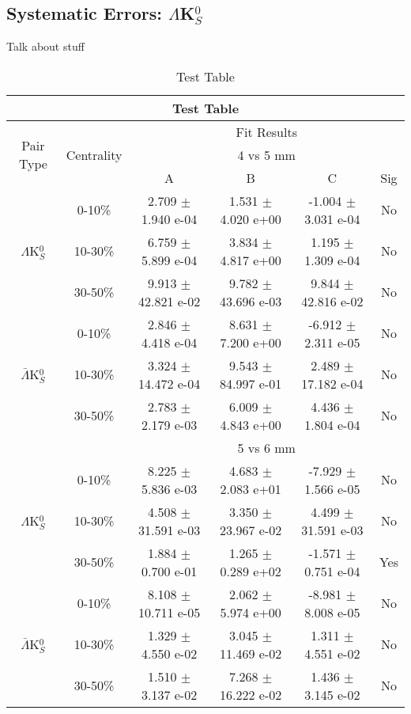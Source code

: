 \documentclass[../AnalysisNoteJBuxton.tex]{subfiles}
\begin{document}
\subsection{Systematic Errors: \texorpdfstring{$\Lambda$K$^{0}_{S}$}{TEXT}}
\label{SysErrsLamK0}

Talk about stuff

\begin{table}
 \centering
 \begin{tabular}{|c|c|c|c|c|c|}
  \multicolumn{6}{c}{Test Table} \\
  \hline
  \multirow{3}{*}{Pair Type} & \multirow{3}{*}{Centrality} & \multicolumn{4}{c|}{Fit Results} \\
  \cline{3-6}
   & & \multicolumn{4}{c|}{4 vs 5 mm} \\
  \cline{3-6}
   & & A & B & C & Sig \\
  \hline  
  \multirow{3}{*}{$\Lambda$K$^{0}_{S}$}
   & 0-10\% & 2.709 $\pm$ 1.940 e-04 & 1.531 $\pm$ 4.020 e+00 & -1.004 $\pm$ 3.031 e-04 & No \\
   & 10-30\% & 6.759 $\pm$ 5.899 e-04 & 3.834 $\pm$ 4.817 e+00 & 1.195 $\pm$ 1.309 e-04 & No \\
   & 30-50\% & 9.913 $\pm$ 42.821 e-02 & 9.782 $\pm$ 43.696 e-03 & 9.844 $\pm$ 42.816 e-02 & No \\
  \hline
  \multirow{3}{*}{$\bar{\Lambda}$K$^{0}_{S}$}  
   & 0-10\% & 2.846 $\pm$ 4.418 e-04 & 8.631 $\pm$ 7.200 e+00 & -6.912 $\pm$ 2.311 e-05 & No \\
   & 10-30\% & 3.324 $\pm$ 14.472 e-04 & 9.543 $\pm$ 84.997 e-01 & 2.489 $\pm$ 17.182 e-04 & No \\
   & 30-50\% & 2.783 $\pm$ 2.179 e-03 & 6.009 $\pm$ 4.843 e+00 & 4.436 $\pm$ 1.804 e-04 & No \\
  \hline 
  \multicolumn{2}{|c|}{} & \multicolumn{4}{c|}{5 vs 6 mm} \\
  \hline  
  \multirow{3}{*}{$\Lambda$K$^{0}_{S}$}   
   & 0-10\% & 8.225 $\pm$ 5.836 e-03 & 4.683 $\pm$ 2.083 e+01 & -7.929 $\pm$ 1.566 e-05 & No \\
   & 10-30\% & 4.508 $\pm$ 31.591 e-03 & 3.350 $\pm$ 23.967 e-02 & 4.499 $\pm$ 31.591 e-03 & No \\
   & 30-50\% & 1.884 $\pm$ 0.700 e-01 & 1.265 $\pm$ 0.289 e+02 & -1.571 $\pm$ 0.751 e-04 & Yes \\
  \hline  
  \multirow{3}{*}{$\bar{\Lambda}$K$^{0}_{S}$}
   & 0-10\% & 8.108 $\pm$ 10.711 e-05 & 2.062 $\pm$ 5.974 e+00 & -8.981 $\pm$ 8.008 e-05 & No \\
   & 10-30\% & 1.329 $\pm$ 4.550 e-02 & 3.045 $\pm$ 11.469 e-02 & 1.311 $\pm$ 4.551 e-02 & No \\
   & 30-50\% & 1.510 $\pm$ 3.137 e-02 & 7.268 $\pm$ 16.222 e-02 & 1.436 $\pm$ 3.145 e-02 & No \\
  \hline
 \end{tabular}
 \caption{Test Table}
 \label{tab:Test}
\end{table}
\end{document}

